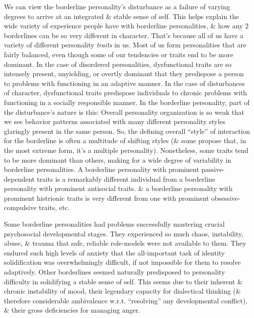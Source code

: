 \documentclass{article}
\numberwithin{equation}{section}
\begin{document}
We can view the borderline personality's disturbance as a failure of varying degrees to arrive at an integrated \& stable sense of self. This helps explain the wide variety of experience people have with borderline personalities, \& how any 2 borderlines can be so very different in character. That's because all of us have a variety of different personality \textit{traits} in us. Most of us form personalities that are fairly balanced, even though some of our tendencies or traits end to be more dominant. In the case of disordered personalities, dysfunctional traits are so intensely present, unyielding, or overtly dominant that they predispose a person to problems with functioning in an adaptive manner. In the case of disturbances of character, dysfunctional traits predispose individuals to chronic problems with functioning in a socially responsible manner. In the borderline personality, part of the disturbance's nature is this: Overall personality organization is so weak that we see behavior patterns associated with many different personality styles glaringly present in the same person. So, the defining overall ``style'' of interaction for the borderline is often a multitude of shifting styles (\& some propose that, in the most extreme form, it's a multiple personality). Nonetheless, some traits tend to be more dominant than others, making for a wide degree of variability in borderline personalities. A borderline personality with prominent passive-dependent traits is a remarkably different individual from a borderline personality with prominent antisocial traits. \& a borderline personality with prominent histrionic traits is very different from one with prominent obsessive-compulsive traits, etc.

Some borderline personalities had problems successfully mastering crucial psychosocial developmental stages. They experienced so much chaos, instability, abuse, \& trauma that safe, reliable role-models were not available to them. They endured such high levels of anxiety that the all-important task of identity solidification was overwhelmingly difficult, if not impossible for them to resolve adaptively. Other borderlines seemed naturally predisposed to personality difficulty in solidifying a stable sense of self. This seems due to their inherent \& chronic instability of mood, their legendary capacity for dialectical thinking (\& therefore considerable ambivalence w.r.t. ``resolving'' any developmental conflict), \& their gross deficiencies for managing anger.
\end{document}
